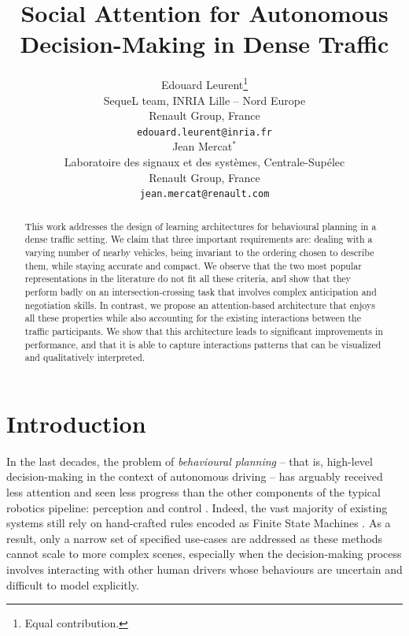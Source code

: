 \documentclass{article}
\title{Social Attention for Autonomous Decision-Making in Dense Traffic}
\author{%
  Edouard Leurent\thanks{Equal contribution.} \\
  SequeL team, INRIA Lille -- Nord Europe\\
  Renault Group, France\\
  \texttt{edouard.leurent@inria.fr} \\
   \And
  Jean Mercat$^*$ \\
  Laboratoire des signaux et des syst\`emes, Centrale-Sup\'elec\\
  Renault Group, France\\
  \texttt{jean.mercat@renault.com} \\
}
\begin{document}
	
	
	
	

\maketitle

\begin{abstract}
  This work addresses the design of learning architectures for behavioural planning in a dense traffic setting. We claim that three important requirements are: dealing with a varying number of nearby vehicles, being invariant to the ordering chosen to describe them, while staying accurate and compact. We observe that the two most popular representations in the literature do not fit all these criteria, and show that they perform badly on an intersection-crossing task that involves complex anticipation and negotiation skills. In contrast, we propose an attention-based architecture that enjoys all these properties while also accounting for the existing interactions between the traffic participants. We show that this architecture leads to significant improvements in performance, and that it is able to capture interactions patterns that can be visualized and qualitatively interpreted.
\end{abstract}

\section{Introduction}

In the last decades, the problem of \emph{behavioural planning} -- that is, high-level decision-making in the context of autonomous driving -- has arguably received less attention and seen less progress than the other components of the typical robotics pipeline: perception and control \citep{Gonzalez2016}. Indeed, the vast majority of existing systems still rely on hand-crafted rules encoded as Finite State Machines \citep{Paden2016}. As a result, only a narrow set of specified use-cases are addressed as these methods cannot scale to more complex scenes, especially when the decision-making process involves interacting with other human drivers whose behaviours are uncertain and difficult to model explicitly.
\end{document}
